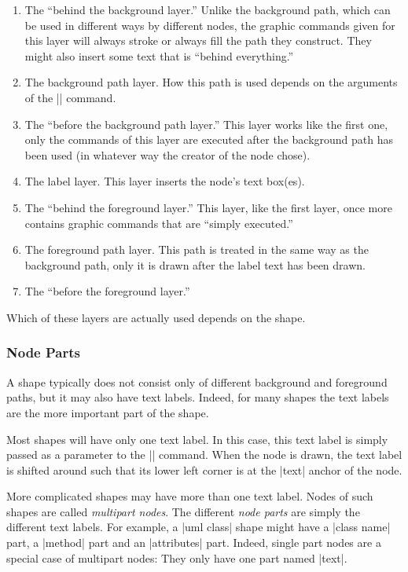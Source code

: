 \begin{enumerate}
\item
  The ``behind the background layer.'' Unlike the background path,
  which can be used in different ways by different nodes, the graphic
  commands given for this layer will always stroke or
  always fill the path they construct. They might also insert some
  text that is ``behind everything.''
\item
  The background path layer. How this path is used depends on the
  arguments of the |\pgfnode| command.
\item
  The ``before the background path layer.'' This layer works like the
  first one, only the commands of this layer are executed after the
  background path has been used (in whatever way the creator of the
  node chose).
\item
  The label layer. This layer inserts the node's text box(es).
\item
  The ``behind the foreground layer.'' This layer, like the
  first layer, once more contains graphic commands that are ``simply
  executed.''
\item
  The foreground path layer. This path is treated in the same way as the
  background path, only it is drawn after the label text has been
  drawn.
\item
  The ``before the foreground layer.''
\end{enumerate}

Which of these layers are actually used depends on the shape.



\subsubsection{Node Parts}

A shape typically does not consist only of different background and
foreground paths, but it may also have text labels. Indeed, for many
shapes the text labels are the more important part of the shape.

Most shapes will have only one text label. In this case, this text
label is simply passed as a parameter to the |\pgfnode| command. When
the node is drawn, the text label is shifted around such that its
lower left corner is at the |text| anchor of the node.

More complicated shapes may have more than one text label. Nodes of
such shapes are called \emph{multipart nodes}. The different
\emph{node parts} are simply the different text labels. For example, a
|uml class| shape might have a |class name| part, a |method| part and
an |attributes| part. Indeed, single part nodes are a special case of
multipart nodes: They only have one part named |text|.

